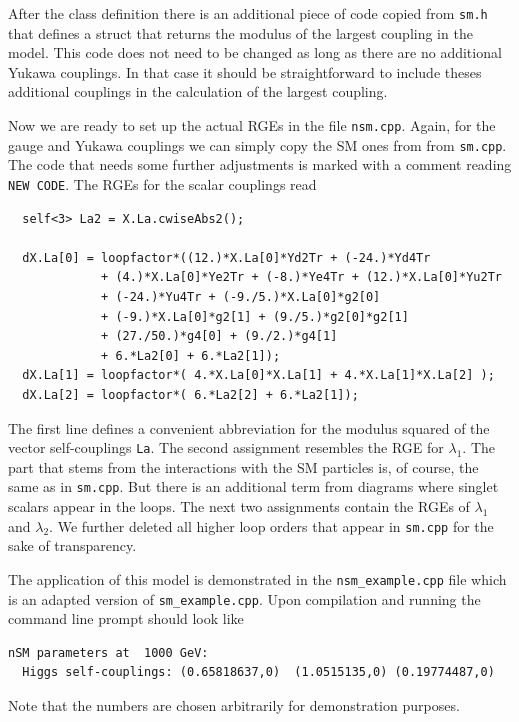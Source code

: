 \documentclass[preprint,12pt]{elsarticle}
\begin{document}
After the class definition there is an additional piece of code copied from \texttt{sm.h} that defines a struct that returns the modulus of the largest coupling in the model. This code does not need to be changed as long as there are no additional Yukawa couplings. In that case it should be straightforward to include theses additional couplings in the calculation of the largest coupling.

Now we are ready to set up the actual RGEs in the file \texttt{nsm.cpp}. Again, for the gauge and Yukawa couplings we can simply copy the SM ones from from \texttt{sm.cpp}. The code that needs some further adjustments is marked with a comment reading \texttt{NEW CODE}. The RGEs for the scalar couplings read
\begin{lstlisting}
  self<3> La2 = X.La.cwiseAbs2();

  dX.La[0] = loopfactor*((12.)*X.La[0]*Yd2Tr + (-24.)*Yd4Tr
             + (4.)*X.La[0]*Ye2Tr + (-8.)*Ye4Tr + (12.)*X.La[0]*Yu2Tr
             + (-24.)*Yu4Tr + (-9./5.)*X.La[0]*g2[0]
             + (-9.)*X.La[0]*g2[1] + (9./5.)*g2[0]*g2[1]
             + (27./50.)*g4[0] + (9./2.)*g4[1]
             + 6.*La2[0] + 6.*La2[1]);
  dX.La[1] = loopfactor*( 4.*X.La[0]*X.La[1] + 4.*X.La[1]*X.La[2] );
  dX.La[2] = loopfactor*( 6.*La2[2] + 6.*La2[1]);
\end{lstlisting}
The first line defines a convenient abbreviation for the modulus squared of the vector self-couplings \texttt{La}. The second assignment resembles the RGE for $\lambda_1$. The part that stems from the interactions with the SM particles is, of course, the same as in \texttt{sm.cpp}. But there is an additional term from diagrams where singlet scalars appear in the loops. The next two assignments contain the RGEs of $\lambda_1$ and $\lambda_2$. We further deleted all higher loop orders that appear in \texttt{sm.cpp} for the sake of transparency.

The application of this model is demonstrated in the \texttt{nsm\_example.cpp} file which is an adapted version of \texttt{sm\_example.cpp}. Upon compilation and running the command line prompt should look like
\begin{lstlisting}[keywordstyle=\color{blue}]
  nSM parameters at  1000 GeV:
  Higgs self-couplings: (0.65818637,0)  (1.0515135,0) (0.19774487,0)
\end{lstlisting}
Note that the numbers are chosen arbitrarily for demonstration purposes.
\end{document}
